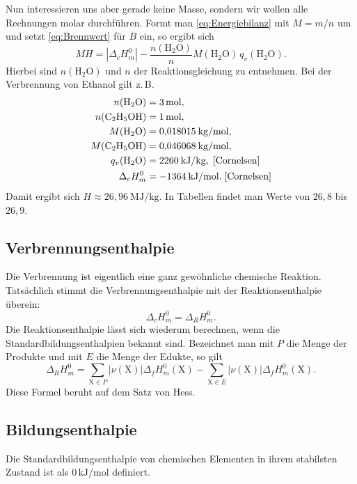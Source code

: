 \documentclass[a4paper,11pt,fleqn,twocolumn]{article}
\newcommand{\unit}[1]{\mathrm{#1}}
\begin{document}
Nun interessieren uns aber gerade keine Masse, sondern wir wollen
alle Rechnungen molar durchführen. Formt man
\eqref{eq:Energiebilanz} mit $M=m/n$ um und setzt \eqref{eq:Brennwert}
für $B$ ein, so ergibt sich
\begin{equation}
MH = |\Delta_c H_m^0| - \frac{n(\mathrm{H_2O})}{n}
M(\mathrm{H_2O})\,q_v(\mathrm{H_2O}).
\end{equation}
Hierbei sind $n(\mathrm{H_2O})$ und $n$ der Reaktionsgleichung
zu entnehmen.
Bei der Verbrennung von Ethanol gilt z.\,B.
\[\begin{split}
n(\mathrm{H_2O}) &= 3\,\unit{mol},\\
n(\mathrm{C_2H_5OH}) &= 1\,\unit{mol},\\
M(\mathrm{H_2O}) &= 0{,}018015\:\unit{kg/mol},\\
M(\mathrm{C_2H_5OH}) &= 0{,}046068\:\unit{kg/mol},\\
q_v(\mathrm{H_2O}) &= 2260\:\unit{kJ/kg},\;\cite{Cornelsen}\\
\Delta_c H_m^0 &= -1364\:\unit{kJ/mol}.\;\cite{Cornelsen}
\end{split}
\]
Damit ergibt sich $H\approx 26{,}96\:\unit{MJ/kg}$.
In Tabellen findet man Werte von $26{,}8$ bis $26{,}9$.

\subsection{Verbrennungsenthalpie}
Die Verbrennung ist eigentlich eine ganz gewöhnliche
chemische Reaktion. Tatsächlich stimmt die Verbrennungsenthalpie
mit der Reaktionsenthalpie überein:
\begin{equation}
\Delta_c H_m^0 = \Delta_R H_m^0.
\end{equation}
Die Reaktionsenthalpie lässt sich wiederum berechnen, wenn die
Standardbildungsenthalpien bekannt sind. Bezeichnet man mit
$P$ die Menge der Produkte und mit $E$ die Menge der Edukte, so gilt
\begin{equation}
\Delta_R H_m^0 = \sum_{\mathrm X\in P}|\nu(\mathrm X)|\Delta_f H_m^0(\mathrm X)
- \sum_{\mathrm X\in E}|\nu(\mathrm X)|\Delta_f H_m^0(\mathrm X).
\end{equation}
Diese Formel beruht auf dem Satz von Hess.

\subsection{Bildungsenthalpie}
Die Standardbildungsenthalpie von chemischen Elementen
in ihrem stabilsten Zustand ist als $0\,\unit{kJ/mol}$ definiert.
\end{document}
